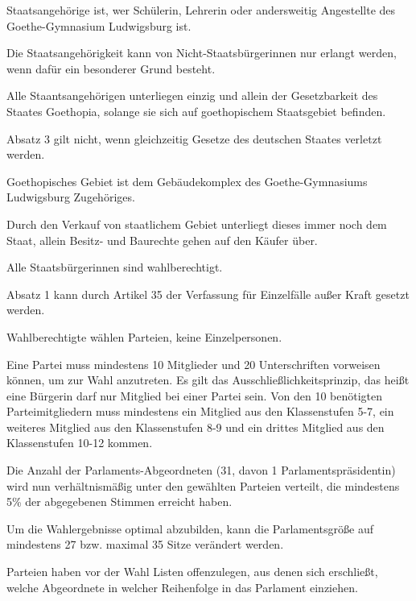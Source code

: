 \documentclass{sasbase}
\begin{document}
\begin{article}[Staatsangehörigkeit]
	\item Staatsangehörige ist, wer Schülerin, Lehrerin oder andersweitig Angestellte des Goethe-Gymnasium Ludwigsburg ist.
	\item Die Staatsangehörigkeit kann von Nicht-Staatsbürgerinnen nur erlangt werden, wenn dafür ein besonderer Grund besteht.
	\item Alle Staantsangehörigen unterliegen einzig und allein der Gesetzbarkeit des Staates Goethopia, solange sie sich auf goethopischem Staatsgebiet befinden.
	\item Absatz 3 gilt nicht, wenn gleichzeitig Gesetze des deutschen Staates verletzt werden.
\end{article}

\begin{article}[Staatsgebiet]
	\item Goethopisches Gebiet ist dem Gebäudekomplex des Goethe-Gymnasiums Ludwigsburg Zugehöriges.
	\item Durch den Verkauf von staatlichem Gebiet unterliegt dieses immer noch dem Staat, allein Besitz- und Baurechte gehen auf den Käufer über.  
\end{article}

\begin{article}[Wahlrecht]
	\item Alle Staatsbürgerinnen sind wahlberechtigt.
	\item Absatz 1 kann durch Artikel 35 der Verfassung für Einzelfälle außer Kraft gesetzt werden.
	\item Wahlberechtigte wählen Parteien, keine Einzelpersonen.
	\item Eine Partei muss mindestens 10 Mitglieder und 20 Unterschriften vorweisen können, um zur Wahl anzutreten. Es gilt das Ausschlie{\ss}lichkeitsprinzip, das hei{\ss}t eine B\"{u}rgerin darf nur Mitglied bei einer Partei sein. Von den 10 ben\"{o}tigten Parteimitgliedern muss mindestens ein Mitglied aus den Klassenstufen 5-7, ein weiteres Mitglied aus den Klassenstufen 8-9 und ein drittes Mitglied aus den Klassenstufen 10-12 kommen.
	\item Die Anzahl der Parlaments-Abgeordneten (31, davon 1 Parlamentspräsidentin) wird nun verhältnismäßig unter den gewählten Parteien verteilt, die mindestens 5\% der abgegebenen Stimmen erreicht haben.
    \item Um die Wahlergebnisse optimal abzubilden, kann die Parlamentsgröße auf mindestens 27 bzw.
        maximal 35 Sitze verändert werden.
	\item Parteien haben vor der Wahl Listen offenzulegen, aus denen sich erschließt, welche Abgeordnete in welcher Reihenfolge in das Parlament einziehen.
\end{article}
\end{document}
